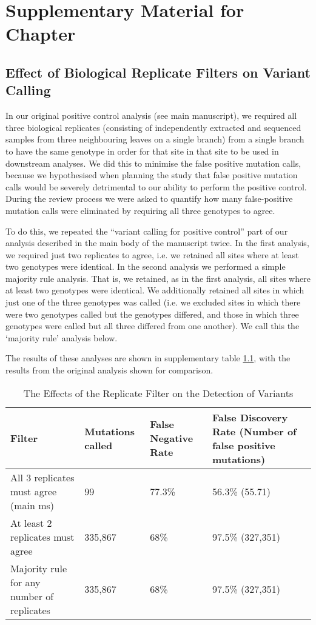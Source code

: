 \chapter{Supplementary Material for Chapter \protect\phylogenomicref{}}
\label{ch:ch2_supplement}
\newpage
\section{Effect of Biological Replicate Filters on Variant Calling}

In our original positive control analysis (see main manuscript), we required all three biological replicates (consisting of independently extracted and sequenced samples from three neighbouring leaves on a single branch) from a single branch to have the same genotype in order for that site in that site to be used in downstream analyses. We did this to minimise the false positive mutation calls, because we hypothesised when planning the study that false positive mutation calls would be severely detrimental to our ability to perform the positive control. During the review process we were asked to quantify how many false-positive mutation calls were eliminated by requiring all three genotypes to agree. 

To do this, we repeated the “variant calling for positive control” part of our analysis described in the main body of the manuscript twice. In the first analysis, we required just two replicates to agree, i.e. we retained all sites where at least two genotypes were identical. In the second analysis we performed a simple majority rule analysis. That is, we retained, as in the first analysis, all sites where at least two genotypes were identical. We additionally retained all sites in which just one of the three genotypes was called (i.e. we excluded sites in which there were two genotypes called but the genotypes differed, and those in which three genotypes were called but all three differed from one another). We call this the ‘majority rule’ analysis below.

The results of these analyses are shown in supplementary table \ref{table:supp_repfilter}, with the results from the original analysis shown for comparison.

\begin{table}
\centering
\begin{tabularx}{\textwidth}{X X X X}
\toprule
Filter & Mutations called & False Negative Rate & False Discovery Rate (Number of false positive mutations) \\
\midrule
All 3 replicates must agree (main ms) & 99 & 77.3\% & 56.3\% (55.71) \\
At least 2 replicates must agree & 335,867 & 68\% & 97.5\% (327,351) \\
Majority rule for any number of replicates & 335,867 & 68\% & 97.5\% (327,351) \\
\bottomrule
\end{tabularx}
\caption{The Effects of the Replicate Filter on the Detection of Variants}
\label{table:supp_repfilter}
\end{table}

